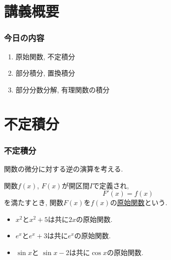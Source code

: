 
\section{講義概要}


\begin{frame}
\frametitle{今日の内容}



\begin{enumerate}
\item 原始関数, 不定積分
\item 部分積分, 置換積分
\item 部分分数分解, 有理関数の積分
\end{enumerate} 



\end{frame}








\section{不定積分}


\begin{frame}
\frametitle{不定積分}

関数の微分に対する逆の演算を考える. 

\begin{Def}
関数$f(x)$, $F(x)$が開区間$I$で定義され, 
$$
F'(x) = f(x)
$$
を満たすとき, 関数$F(x)$を$f(x)$の\underline{原始関数}という. 
\end{Def}


\begin{itemize}
\item $x^2$と$x^2+5$は共に$2x$の原始関数. 
\item $e^x$と$e^x+3$は共に$e^x$の原始関数. 
\item $\sin x$と $\sin x-2$は共に$\cos x$の原始関数. 
\end{itemize}

\end{frame}




